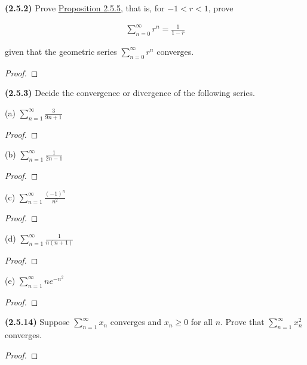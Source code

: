 \documentclass[12pt]{article}
\newcommand{\series}[2]{\displaystyle \sum_{ {#1} }^{ {#2} }}
\begin{document}
\pagestyle{fancy}
\setlength{\headheight}{14.49998pt}
\fancyfoot[C]{\thepage}

\noindent \textbf{(2.5.2)} Prove \underline{Proposition 2.5.5}, that is, for $-1<r<1$, prove

\begin{align*}
	\series{n=0}{\infty}r^n=\frac{1}{1-r}
\end{align*}

\noindent given that the geometric series $\series{n=0}{\infty}r^n$ converges.

\begin{proof}
	\lipsum[1]
\end{proof}

\newpage

\noindent \textbf{(2.5.3)} Decide the convergence or divergence of the following series.

\noindent (a) $\series{n=1}{\infty}\frac{3}{9n+1}$

\begin{proof}
	\lipsum[1][1-5]
\end{proof}

\noindent (b) $\series{n=1}{\infty}\frac{1}{2n-1}$

\begin{proof}
	\lipsum[1][1-5]
\end{proof}

\noindent (c) $\series{n=1}{\infty}\frac{(-1)^n}{n^2}$

\begin{proof}
	\lipsum[1][1-5]
\end{proof}

\noindent (d) $\series{n=1}{\infty}\frac{1}{n(n+1)}$

\begin{proof}
	\lipsum[1][1-5]
\end{proof}

\noindent (e) $\series{n=1}{\infty}ne^{-n^2}$

\begin{proof}
	\lipsum[1][1-5]
\end{proof}

\newpage

\noindent \textbf{(2.5.14)} Suppose $\series{n=1}{\infty}x_n$ converges and $x_n\ge0$ for all $n$. Prove that $\series{n=1}{\infty} x_n^2$ converges.

\begin{proof}
	\lipsum[1]
\end{proof}
\end{document}
